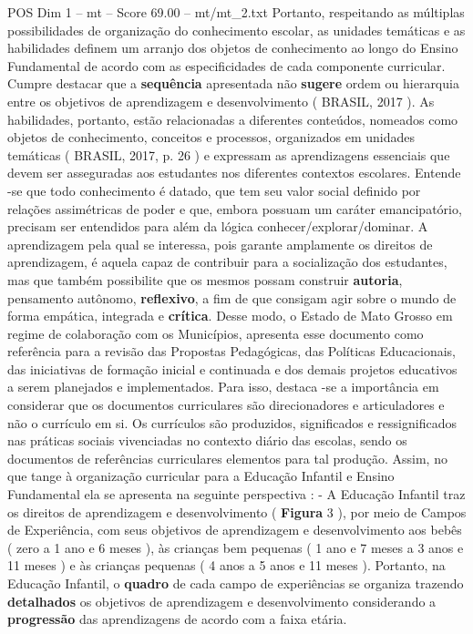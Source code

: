 \begin{textsample}{POS Dim 1 – mt – Score 69.00 – mt/mt\_2.txt}
Portanto, respeitando as múltiplas possibilidades de organização do conhecimento escolar, as unidades temáticas e as habilidades definem um arranjo dos objetos de conhecimento ao longo do Ensino Fundamental de acordo com as especificidades de cada componente curricular.
Cumpre destacar que a \textbf{sequência} apresentada não \textbf{sugere} ordem ou hierarquia entre os objetivos de aprendizagem e desenvolvimento ( BRASIL, 2017 ).
As habilidades, portanto, estão relacionadas a diferentes conteúdos, nomeados como objetos de conhecimento, conceitos e processos, organizados em unidades temáticas ( BRASIL, 2017, p. 26 ) e expressam as aprendizagens essenciais que devem ser asseguradas aos estudantes nos diferentes contextos escolares.
Entende -se que todo conhecimento é datado, que tem seu valor social definido por relações assimétricas de poder e que, embora possuam um caráter emancipatório, precisam ser entendidos para além da lógica conhecer/explorar/dominar.
A aprendizagem pela qual se interessa, pois garante amplamente os direitos de aprendizagem, é aquela capaz de contribuir para a socialização dos estudantes, mas que também possibilite que os mesmos possam construir \textbf{autoria}, pensamento autônomo, \textbf{reflexivo}, a fim de que consigam agir sobre o mundo de forma empática, integrada e \textbf{crítica}.
Desse modo, o Estado de Mato Grosso em regime de colaboração com os Municípios, apresenta esse documento como referência para a revisão das Propostas Pedagógicas, das Políticas Educacionais, das iniciativas de formação inicial e continuada e dos demais projetos educativos a serem planejados e implementados.
Para isso, destaca -se a importância em considerar que os documentos curriculares são direcionadores e articuladores e não o currículo em si.
Os currículos são produzidos, significados e ressignificados nas práticas sociais vivenciadas no contexto diário das escolas, sendo os documentos de referências curriculares elementos para tal produção.
Assim, no que tange à organização curricular para a Educação Infantil e Ensino Fundamental ela se apresenta na seguinte perspectiva : - A Educação Infantil traz os direitos de aprendizagem e desenvolvimento ( \textbf{Figura} 3 ), por meio de Campos de Experiência, com seus objetivos de aprendizagem e desenvolvimento aos bebês ( zero a 1 ano e 6 meses ), às crianças bem pequenas ( 1 ano e 7 meses a 3 anos e 11 meses ) e às crianças pequenas ( 4 anos a 5 anos e 11 meses ).
Portanto, na Educação Infantil, o \textbf{quadro} de cada campo de experiências se organiza trazendo \textbf{detalhados} os objetivos de aprendizagem e desenvolvimento considerando a \textbf{progressão} das aprendizagens de acordo com a faixa etária.

\end{textsample}
